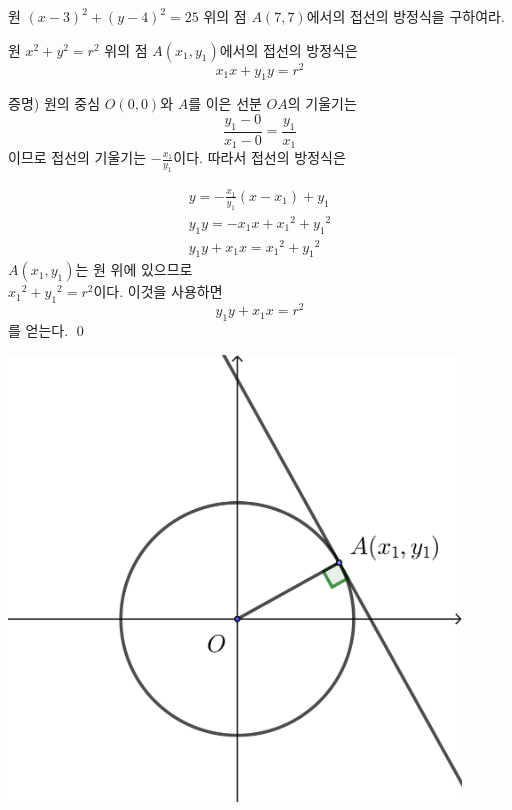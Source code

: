 \documentclass{oblivoir}
\begin{document}
%
\prob{}\label{tangent3}
원 \((x-3)^2+(y-4)^2=25\) 위의 점 \(A(7,7)\)에서의 접선의 방정식을 구하여라.

\newpage
\begin{mdframed}
%
\theo{}\label{tangent4}
원 \(x^2+y^2=r^2\) 위의 점 \(A(x_1,y_1)\)에서의 접선의 방정식은
\[x_1x+y_1y=r^2\]
\end{mdframed}

\bigskip\noindent\textsf{증명\footnotemark)}
원의 중심 \(O(0,0)\)와 \(A\)를 이은 선분 \(OA\)의 기울기는
\[\frac{y_1-0}{x_1-0}=\frac{y_1}{x_1}\]
이므로 접선의 기울기는 \(-\frac{x_1}{y_1}\)이다.
따라서 접선의 방정식은

\begin{minipage}{0.55\textwidth}
\begin{gather*}
y=-\frac{x_1}{y_1}(x-x_1)+y_1\\
y_1y=-x_1x+{x_1}^2+{y_1}^2\\
y_1y+x_1x={x_1}^2+{y_1}^2
\end{gather*}
\(A(x_1,y_1)\)는 원 위에 있으므로\\
\({x_1}^2+{y_1}^2=r^2\)이다.
이것을 사용하면
\[y_1y+x_1x=r^2\]
를 얻는다.
\qed
\end{minipage}
\begin{minipage}{0.4\textwidth}
\begin{center}
\includegraphics[width=0.9\textwidth]{tangent_4}
\end{center}
\end{minipage}
\end{document}
